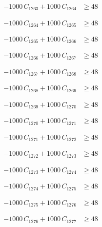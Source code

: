 \documentclass[a4paper,11pt]{article}
\begin{document}
\begin{align}
-1000\,C_{1263} + 1000\,C_{1264} &\geq 48 \nonumber
\end{align}

\begin{align}
-1000\,C_{1264} + 1000\,C_{1265} &\geq 48 \nonumber
\end{align}

\begin{align}
-1000\,C_{1265} + 1000\,C_{1266} &\geq 48 \nonumber
\end{align}

\begin{align}
-1000\,C_{1266} + 1000\,C_{1267} &\geq 48 \nonumber
\end{align}

\begin{align}
-1000\,C_{1267} + 1000\,C_{1268} &\geq 48 \nonumber
\end{align}

\begin{align}
-1000\,C_{1268} + 1000\,C_{1269} &\geq 48 \nonumber
\end{align}

\begin{align}
-1000\,C_{1269} + 1000\,C_{1270} &\geq 48 \nonumber
\end{align}

\begin{align}
-1000\,C_{1270} + 1000\,C_{1271} &\geq 48 \nonumber
\end{align}

\begin{align}
-1000\,C_{1271} + 1000\,C_{1272} &\geq 48 \nonumber
\end{align}

\begin{align}
-1000\,C_{1272} + 1000\,C_{1273} &\geq 48 \nonumber
\end{align}

\begin{align}
-1000\,C_{1273} + 1000\,C_{1274} &\geq 48 \nonumber
\end{align}

\begin{align}
-1000\,C_{1274} + 1000\,C_{1275} &\geq 48 \nonumber
\end{align}

\begin{align}
-1000\,C_{1275} + 1000\,C_{1276} &\geq 48 \nonumber
\end{align}

\begin{align}
-1000\,C_{1276} + 1000\,C_{1277} &\geq 48 \nonumber
\end{align}
\end{document}
